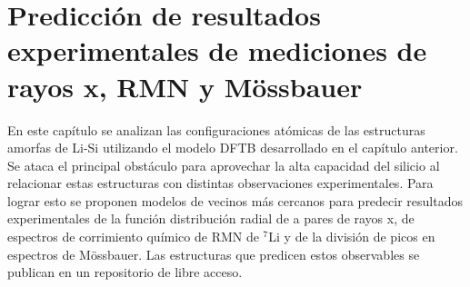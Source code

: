 \chapter{Predicción de resultados experimentales de mediciones de rayos x, RMN y Mössbauer}\label{ch:prediccion}
\thispagestyle{empty}

\vspace{50pt}

\begin{adjustwidth}{50pt}{50pt}
    En este capítulo se analizan las configuraciones atómicas de las estructuras
    amorfas de Li-Si utilizando el modelo DFTB desarrollado en el capítulo 
    anterior. Se ataca el principal obstáculo para aprovechar la alta capacidad 
    del silicio al relacionar estas estructuras con distintas observaciones 
    experimentales. Para lograr esto se proponen modelos de vecinos más 
    cercanos para predecir resultados experimentales de la función 
    distribución radial de a pares de rayos x, de espectros de corrimiento 
    químico de RMN de $^7$Li y de la división de picos en espectros de 
    Mössbauer. Las estructuras que predicen estos observables se publican
    en un repositorio de libre acceso.
\end{adjustwidth}

\clearpage
\newpage
\thispagestyle{empty}
\mbox{}
\newpage








